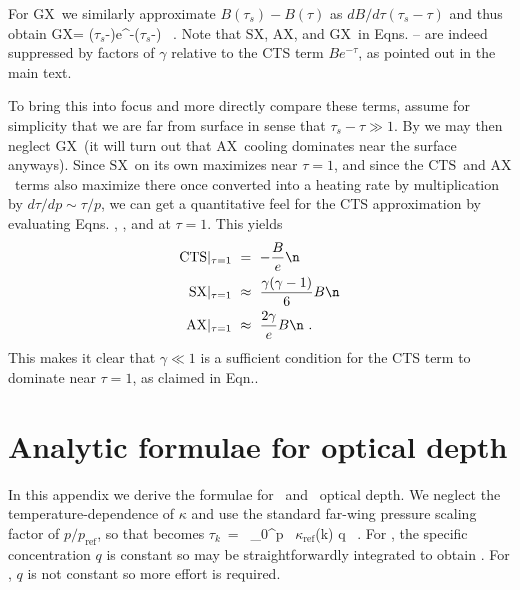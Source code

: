 \documentclass[10pt]{article}
\newcommand{\tauk}{\ensuremath{\tau_k}}
\newcommand{\taus}{\ensuremath{\tau_s}}
\newcommand{\tautilde}{\ensuremath{\tilde{\tau}}}
\newcommand{\SX}{\ensuremath{\mathrm{SX}}}
\newcommand{\AX}{\ensuremath{\mathrm{AX}}}
\newcommand{\GX}{\ensuremath{\mathrm{GX}}}
\newcommand{\CTS}{\ensuremath{\mathrm{CTS}}}
\newcommand{\kapparef}{\ensuremath{\kappa_{\mathrm{ref}}}}
\newcommand{\pref}{\ensuremath{p_{\mathrm{ref}}}}
\begin{document}
For \GX\  we similarly approximate $B(\taus) - B(\tau)$ as $dB/d\tau (\taus-\tau)$ and thus obtain
\beqn
	\GX  =    (\taus-\tau)e^{-(\taus-\tau)}  \ .
	\label{gx2}
\eeqn
Note that \SX, \AX, and \GX\  in  Eqns.  --  are indeed suppressed by factors of $\gamma $ relative to the  CTS term $Be^{-\tau}$, as pointed out in the main text.  

To bring this into focus and more directly compare these terms,  assume for simplicity that we are far from surface in sense that $\taus-\tau \gg 1$. By  we may then neglect \GX\ (it will turn out that \AX\ cooling dominates near the surface anyways). Since \SX\ on its own maximizes near $\tau=1$, and since the \CTS\ and \AX\ terms also maximize there once converted into a heating rate by multiplication by $d\tau/dp \sim \tau/p$, we can get a quantitative feel for the  CTS approximation by evaluating Eqns. , , and  at $\tau=1$. This yields
 \begin{align}
 	\CTS|_{\tau=1} & \ = \  - \frac{B}{e}  \n \\
 	\SX|_{\tau=1} &\ \approx   \ \frac{\gamma(\gamma-1) }{6} B \n \\
 	\AX|_{\tau=1} & \ \approx  \  \frac{2\gamma }{ e} B \n  \ .
\end{align}
This makes it clear that $\gamma \ll 1$ is a sufficient condition for the CTS term to dominate near $\tau=1$, as claimed in Eqn..


	
	\section{Analytic formulae for optical depth}	 \label{appendix_tau_formulae}	
In this appendix we derive the formulae  for \htwo\ and \cotwo\ optical depth. We neglect the temperature-dependence of $\kappa$ and use the standard far-wing pressure scaling factor of $p/\pref$, so that  becomes
\beqn
	\tauk \ =  \ \int_0^p \, \kapparef(k)\frac{p'}{\pref} q \ .
	\label{tauk1}
\eeqn
For \cotwo, the specific concentration $q$ is constant so  may be straightforwardly integrated to obtain . For \htwo, $q$ is not constant so more effort is required.
	
\end{document}
